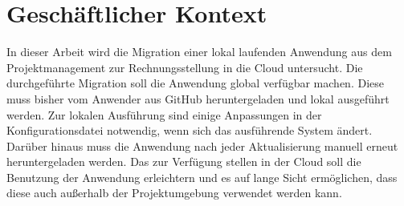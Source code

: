 \section{Geschäftlicher Kontext}

In dieser Arbeit wird die Migration einer lokal laufenden Anwendung aus dem Projektmanagement zur Rechnungsstellung in die Cloud untersucht.
Die durchgeführte Migration soll die Anwendung global verfügbar machen. Diese muss bisher vom Anwender aus GitHub heruntergeladen und lokal ausgeführt werden.
Zur lokalen Ausführung sind einige Anpassungen in der Konfigurationsdatei notwendig, wenn sich das ausführende System ändert.
Darüber hinaus muss die Anwendung nach jeder Aktualisierung manuell erneut heruntergeladen werden.
Das zur Verfügung stellen in der Cloud soll die Benutzung der Anwendung erleichtern und es auf lange Sicht ermöglichen, dass diese auch außerhalb der Projektumgebung verwendet werden kann.
